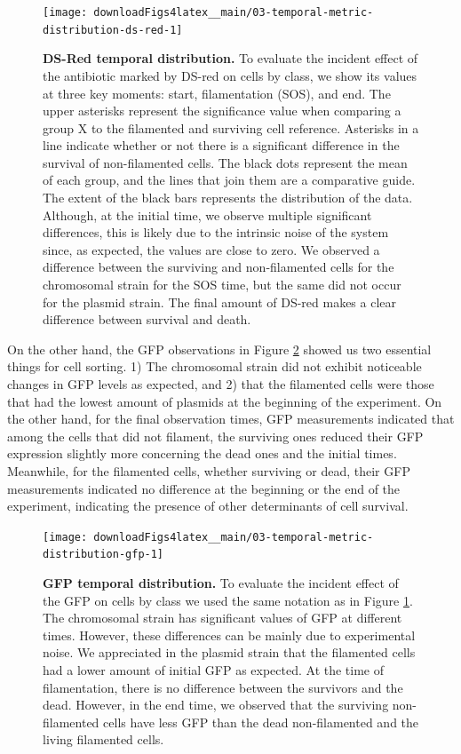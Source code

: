 \documentclass[a4paper, nobind]{templates/ociamthesis}
\begin{document}
\begin{figure}[H]
\texttt{[image: downloadFigs4latex\_\_main/03-temporal-metric-distribution-ds-red-1]} \caption[DS-Red temporal distribution.]{\textbf{DS-Red temporal distribution.} To evaluate the incident effect of the antibiotic marked by DS-red on cells by class, we show its values at three key moments: start, filamentation (SOS), and end. The upper asterisks represent the significance value when comparing a group X to the filamented and surviving cell reference. Asterisks in a line indicate whether or not there is a significant difference in the survival of non-filamented cells. The black dots represent the mean of each group, and the lines that join them are a comparative guide. The extent of the black bars represents the distribution of the data. Although, at the initial time, we observe multiple significant differences, this is likely due to the intrinsic noise of the system since, as expected, the values are close to zero. We observed a difference between the surviving and non-filamented cells for the chromosomal strain for the SOS time, but the same did not occur for the plasmid strain. The final amount of DS-red makes a clear difference between survival and death.}\label{fig:03-temporal-metric-distribution-ds-red-1}
\end{figure}

On the other hand, the GFP observations in Figure \ref{fig:03-temporal-metric-distribution-gfp-1} showed us two essential things for cell sorting.
1) The chromosomal strain did not exhibit noticeable changes in GFP levels as expected, and 2) that the filamented cells were those that had the lowest amount of plasmids at the beginning of the experiment.
On the other hand, for the final observation times, GFP measurements indicated that among the cells that did not filament, the surviving ones reduced their GFP expression slightly more concerning the dead ones and the initial times.
Meanwhile, for the filamented cells, whether surviving or dead, their GFP measurements indicated no difference at the beginning or the end of the experiment, indicating the presence of other determinants of cell survival.





\begin{figure}[H]
\texttt{[image: downloadFigs4latex\_\_main/03-temporal-metric-distribution-gfp-1]} \caption[GFP temporal distribution.]{\textbf{GFP temporal distribution.} To evaluate the incident effect of the GFP on cells by class we used the same notation as in Figure \ref{fig:03-temporal-metric-distribution-ds-red-1}. The chromosomal strain has significant values of GFP at different times. However, these differences can be mainly due to experimental noise. We appreciated in the plasmid strain that the filamented cells had a lower amount of initial GFP as expected. At the time of filamentation, there is no difference between the survivors and the dead. However, in the end time, we observed that the surviving non-filamented cells have less GFP than the dead non-filamented and the living filamented cells.}\label{fig:03-temporal-metric-distribution-gfp-1}
\end{figure}
\end{document}
